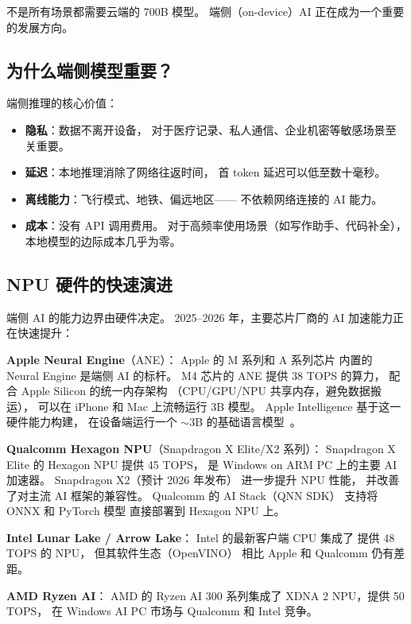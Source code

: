 不是所有场景都需要云端的 700B 模型。
端侧（on-device）AI 正在成为一个重要的发展方向。

\subsection{为什么端侧模型重要？}

端侧推理的核心价值：

\begin{itemize}[noitemsep]
  \item \textbf{隐私}：数据不离开设备，
        对于医疗记录、私人通信、企业机密等敏感场景至关重要。
  \item \textbf{延迟}：本地推理消除了网络往返时间，
        首 token 延迟可以低至数十毫秒。
  \item \textbf{离线能力}：飞行模式、地铁、偏远地区——
        不依赖网络连接的 AI 能力。
  \item \textbf{成本}：没有 API 调用费用。
        对于高频率使用场景（如写作助手、代码补全），
        本地模型的边际成本几乎为零。
\end{itemize}

\subsection{NPU 硬件的快速演进}
\label{sec:npu-hardware}

端侧 AI 的能力边界由硬件决定。
2025--2026 年，主要芯片厂商的 AI 加速能力正在快速提升：

\textbf{Apple Neural Engine}（ANE）：
Apple 的 M 系列和 A 系列芯片
内置的 Neural Engine 是端侧 AI 的标杆。
M4 芯片的 ANE 提供 38 TOPS 的算力，
配合 Apple Silicon 的统一内存架构
（CPU/GPU/NPU 共享内存，避免数据搬运），
可以在 iPhone 和 Mac 上流畅运行 3B 模型。
Apple Intelligence 基于这一硬件能力构建，
在设备端运行一个 $\sim$3B 的基础语言模型~\cite{gunter2024appleintelligence}。

\textbf{Qualcomm Hexagon NPU}（Snapdragon X Elite/X2 系列）：
Snapdragon X Elite 的 Hexagon NPU 提供 45 TOPS，
是 Windows on ARM PC 上的主要 AI 加速器。
Snapdragon X2（预计 2026 年发布）
进一步提升 NPU 性能，
并改善了对主流 AI 框架的兼容性。
Qualcomm 的 AI Stack（QNN SDK）
支持将 ONNX 和 PyTorch 模型
直接部署到 Hexagon NPU 上。

\textbf{Intel Lunar Lake / Arrow Lake}：
Intel 的最新客户端 CPU 集成了
提供 48 TOPS 的 NPU，
但其软件生态（OpenVINO）
相比 Apple 和 Qualcomm 仍有差距。

\textbf{AMD Ryzen AI}：
AMD 的 Ryzen AI 300 系列集成了
XDNA 2 NPU，提供 50 TOPS，
在 Windows AI PC 市场与 Qualcomm 和 Intel 竞争。


